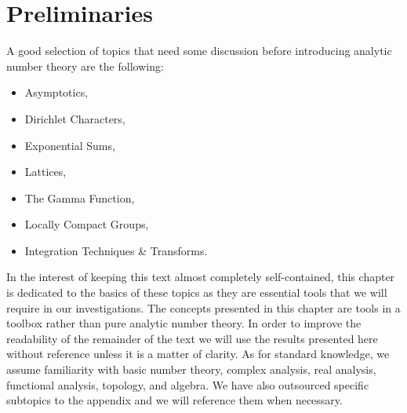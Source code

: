 \chapter{Preliminaries}\label{ch:Preliminaries}
  A good selection of topics that need some discussion before introducing analytic number theory are the following:
  \begin{itemize}
    \item Asymptotics,
    \item Dirichlet Characters,
    \item Exponential Sums,
    \item Lattices,
    \item The Gamma Function,
    \item Locally Compact Groups,
    \item Integration Techniques \& Transforms.
  \end{itemize}
  In the interest of keeping this text almost completely self-contained, this chapter is dedicated to the basics of these topics as they are essential tools that we will require in our investigations. The concepts presented in this chapter are tools in a toolbox rather than pure analytic number theory. In order to improve the readability of the remainder of the text we will use the results presented here without reference unless it is a matter of clarity. As for standard knowledge, we assume familiarity with basic number theory, complex analysis, real analysis, functional analysis, topology, and algebra. We have also outsourced specific subtopics to the appendix and we will reference them when necessary.
